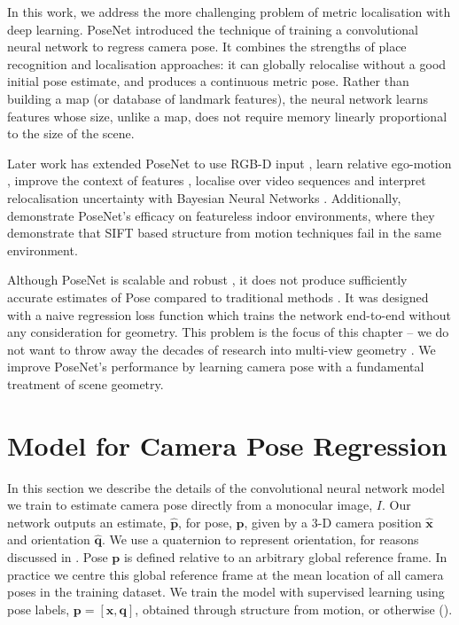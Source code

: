 In this work, we address the more challenging problem of metric localisation with deep learning. PoseNet \citep{kendall2015posenet} introduced the technique of training a convolutional neural network to regress camera pose. It combines the strengths of place recognition and localisation approaches: it can globally relocalise without a good initial pose estimate, and produces a continuous metric pose. Rather than building a map (or database of landmark features), the neural network learns features whose size, unlike a map, does not require memory linearly proportional to the size of the scene.

Later work has extended PoseNet to use RGB-D input \citep{li2017indoor}, learn relative ego-motion \citep{melekhov2017relative}, improve the context of features \citep{walch2016image}, localise over video sequences \citep{clark2017vidloc} and interpret relocalisation uncertainty with Bayesian Neural Networks \citep{kendall2015modelling}. Additionally, \citep{walch2016image} demonstrate PoseNet's efficacy on featureless indoor environments, where they demonstrate that SIFT based structure from motion techniques fail in the same environment.

Although PoseNet is scalable and robust \citep{kendall2015posenet}, it does not produce sufficiently accurate estimates of Pose compared to traditional methods \citep{Sattler14ECCV}. It was designed with a naive regression loss function which trains the network end-to-end without any consideration for geometry. This problem is the focus of this chapter -- we do not want to throw away the decades of research into multi-view geometry \citep{hartley2000}. We improve PoseNet's performance by learning camera pose with a fundamental treatment of scene geometry.

\section{Model for Camera Pose Regression}
\label{sec:model}

In this section we describe the details of the convolutional neural network model we train to estimate camera pose directly from a monocular image, $I$. Our network outputs an estimate, $\mathbf{\hat{p}}$, for pose, $\mathbf{p}$, given by a 3-D camera position $\mathbf{\hat{x}}$ and orientation $\mathbf{\hat{q}}$. We use a quaternion to represent orientation, for reasons discussed in . Pose $\mathbf{p}$ is defined relative to an arbitrary global reference frame. In practice we centre this global reference frame at the mean location of all camera poses in the training dataset. We train the model with supervised learning using pose labels, $\mathbf{p} = [\mathbf{x}, \mathbf{q}]$, obtained through structure from motion, or otherwise (). 

